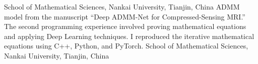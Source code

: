 \documentclass[11pt,a4paper, final]{moderncv}
\begin{document}
	{}{}{School of Mathematical Sciences, Nankai University, Tianjin, China}
	{ADMM model from the manuscript “Deep ADMM-Net for Compressed-Sensing MRI.”}
	{The second programming experience involved proving mathematical equations and applying Deep Learning techniques. 
	I reproduced the iterative mathematical equations using C++, Python, and PyTorch.}
	{}{}{School of Mathematical Sciences, Nankai University, Tianjin, China}
\end{document}
